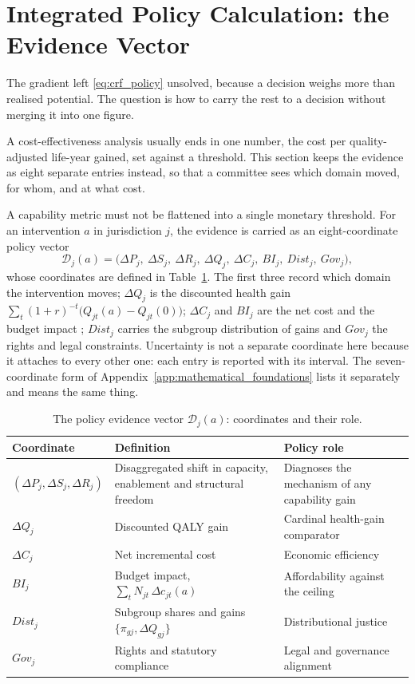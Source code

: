 \section{Integrated Policy Calculation: the Evidence Vector}
The gradient left \eqref{eq:crf_policy} unsolved, because a decision weighs
more than realised potential. The question is how to carry the rest to a
decision without merging it into one figure.

A cost-effectiveness analysis usually ends in one number, the cost per
quality-adjusted life-year gained, set against a threshold. This section keeps
the evidence as eight separate entries instead, so that a committee sees which
domain moved, for whom, and at what cost.

A capability metric must not be flattened into a single monetary threshold. For an
intervention $a$ in jurisdiction $j$, the evidence is carried as an eight-coordinate
policy vector \citep{drummond2015}
\begin{equation}
\mathcal{D}_j(a)=\big(\Delta P_j,\ \Delta S_j,\ \Delta R_j,\ \Delta Q_j,\ \Delta C_j,\ BI_j,\ Dist_j,\ Gov_j\big),
\label{eq:evidence_vector}
\end{equation}
whose coordinates are defined in Table~\ref{tab:evidence_vector}. The first three
record which domain the intervention moves; $\Delta Q_j$ is the discounted health
gain $\sum_{t}(1+r)^{-t}\big(Q_{jt}(a)-Q_{jt}(0)\big)$; $\Delta C_j$ and $BI_j$ are the
net cost and the budget impact \citep{sullivan_2014}; $Dist_j$ carries the subgroup distribution of gains
and $Gov_j$ the rights and legal constraints. Uncertainty is not a separate
coordinate here because it attaches to every other one: each entry is reported
with its interval. The seven-coordinate form of
Appendix~\ref{app:mathematical_foundations} lists it separately and means the
same thing.

\begin{table}[htbp]\centering
\caption{The policy evidence vector $\mathcal{D}_j(a)$: coordinates and their role.}
\label{tab:evidence_vector}
\small
\begin{tabular}{p{2.6cm} p{5.6cm} p{4.6cm}}
\toprule
\textbf{Coordinate} & \textbf{Definition} & \textbf{Policy role} \\
\midrule
$(\Delta P_j,\Delta S_j,\Delta R_j)$ & Disaggregated shift in capacity, enablement and structural freedom & Diagnoses the mechanism of any capability gain \\
\addlinespace
$\Delta Q_j$ & Discounted QALY gain & Cardinal health-gain comparator \citep{whitehead_2010} \\
\addlinespace
$\Delta C_j$ & Net incremental cost & Economic efficiency \\
\addlinespace
$BI_j$ & Budget impact, $\sum_t N_{jt}\,\Delta c_{jt}(a)$ & Affordability against the ceiling \\
\addlinespace
$Dist_j$ & Subgroup shares and gains $\{\pi_{gj},\Delta Q_{gj}\}$ & Distributional justice \\
\addlinespace
$Gov_j$ & Rights and statutory compliance & Legal and governance alignment \\
\bottomrule
\end{tabular}
\end{table}

